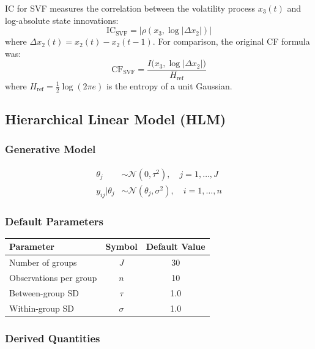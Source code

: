 \documentclass[10pt]{article} %
\theoremstyle{plain}
\theoremstyle{definition}
\newcommand{\IC}{\mathrm{IC}}  %
\newcommand{\MI}{I}
\begin{document}
IC for SVF measures the correlation between the volatility process $x_3(t)$ and log-absolute state innovations:
\begin{equation}
\IC_{\text{SVF}} = |\rho(x_3, \log|\Delta x_2|)|
\end{equation}
where $\Delta x_2(t) = x_2(t) - x_2(t-1)$. For comparison, the original CF formula was:
\begin{equation}
\text{CF}_{\text{SVF}} = \frac{\MI\bigl(x_3, \log|\Delta x_2|\bigr)}{H_{\text{ref}}}
\end{equation}
where $H_{\text{ref}} = \frac{1}{2}\log(2\pi e)$ is the entropy of a unit Gaussian.

\subsection{Hierarchical Linear Model (HLM)}

\subsubsection{Generative Model}

\begin{align}
\theta_j &\sim \mathcal{N}(0, \tau^2), \quad j = 1, \ldots, J \\
y_{ij} | \theta_j &\sim \mathcal{N}(\theta_j, \sigma^2), \quad i = 1, \ldots, n
\end{align}

\subsubsection{Default Parameters}

\begin{center}
\begin{tabular}{lcc}
\toprule
Parameter & Symbol & Default Value \\
\midrule
Number of groups & $J$ & 30 \\
Observations per group & $n$ & 10 \\
Between-group SD & $\tau$ & 1.0 \\
Within-group SD & $\sigma$ & 1.0 \\
\bottomrule
\end{tabular}
\end{center}

\subsubsection{Derived Quantities}
\end{document}

